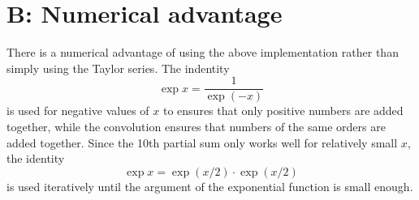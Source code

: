 \documentclass[onecolumn]{article}
\begin{document}
	\section{B: Numerical advantage}
	There is a numerical advantage of using the above implementation rather than simply using the Taylor series. The indentity
	\begin{equation}\exp x=\frac{1}{\exp (-x)} \end{equation} is used for negative values of $x$ to ensures that only positive
	 numbers are added together, while the convolution ensures that numbers of the same orders are added together. Since the 10th
	partial sum only works well for relatively small $x$, the identity 
	\begin{equation}\exp x = \exp (x/2) \cdot \exp (x/2)\end{equation}
	is used iteratively until the argument of the exponential function is small enough. 
	
\end{document}
